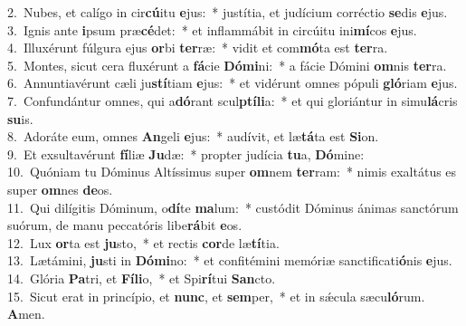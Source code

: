 {2.~}Nubes, et calígo in cir\textbf{cú}itu \textbf{e}jus:~* justítia, et judícium corréctio \textbf{se}dis \textbf{e}jus.\\
{3.~}Ignis ante \textbf{i}psum præ\textbf{cé}det:~* et inflammábit in circúitu ini\textbf{mí}cos \textbf{e}jus.\\
{4.~}Illuxérunt fúlgura ejus \textbf{or}bi \textbf{ter}ræ:~* vidit et com\textbf{mó}ta est \textbf{ter}ra.\\
{5.~}Montes, sicut cera fluxérunt a \textbf{fá}cie \textbf{Dó}\textbf{mi}ni:~* a fácie Dómini \textbf{om}nis \textbf{ter}ra.\\
{6.~}Annuntiavérunt cæli ju\textbf{stí}tiam \textbf{e}jus:~* et vidérunt omnes pópuli \textbf{gló}riam \textbf{e}jus.\\
{7.~}Confundántur omnes, qui a\textbf{dó}rant scul\textbf{ptí}\textbf{li}a:~* et qui gloriántur in simu\textbf{lá}cris \textbf{su}is.\\
{8.~}Adoráte eum, omnes \textbf{An}geli \textbf{e}jus:~* audívit, et læ\textbf{tá}ta est \textbf{Si}on.\\
{9.~}Et exsultavérunt \textbf{fí}liæ \textbf{Ju}dæ:~* propter judícia \textbf{tu}a, \textbf{Dó}mine:\\
{10.~}Quóniam tu Dóminus Altíssimus super \textbf{om}nem \textbf{ter}ram:~* nimis exaltátus es super \textbf{om}nes \textbf{de}os.\\
{11.~}Qui dilígitis Dóminum, o\textbf{dí}te \textbf{ma}lum:~* custódit Dóminus ánimas sanctórum suórum, de manu peccatóris libe\textbf{rá}bit \textbf{e}os.\\
{12.~}Lux \textbf{or}ta est \textbf{ju}sto,~* et rectis \textbf{cor}de læ\textbf{tí}tia.\\
{13.~}Lætámini, \textbf{ju}sti in \textbf{Dó}\textbf{mi}no:~* et confitémini memóriæ sanctificati\textbf{ó}nis \textbf{e}jus.\\
{14.~}Glória \textbf{Pa}tri, et \textbf{Fí}\textbf{li}o,~* et Spi\textbf{rí}tui \textbf{San}cto.\\
{15.~}Sicut erat in princípio, et \textbf{nunc}, et \textbf{sem}per,~* et in sǽcula sæcu\textbf{ló}rum. \textbf{A}men.\\
